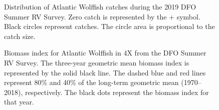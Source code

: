 \documentclass[11pt]{book}
\begin{document}
\begin{figure}[htb]

{\centering {} 

}

\caption{Distribution of Atlantic Wolffish catches during the 2019 DFO Summer RV Survey. Zero catch is represented by the + symbol. Black circles represent catches. The circle area is proportional to the catch size.}\label{fig:65-map-awolffish}
\end{figure}

\begin{figure}[htb]

{\centering {} 

}

\caption{Biomass index for Atlantic Wolffish in 4X from the DFO Summer RV Survey. The three-year geometric mean biomass index is represented by the solid black line. The dashed blue and red lines represent 80\% and 40\% of the long-term geometric mean (1970--2018), respectively. The black dots represent the biomass index for that year.}\label{fig:66-fig-awolffish-biomass4X}
\end{figure}
\end{document}
